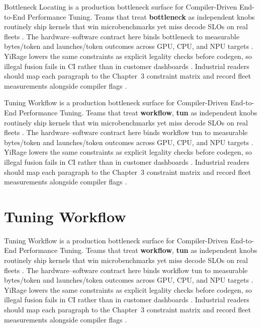 Bottleneck Locating is a production bottleneck surface for Compiler-Driven End-to-End Performance Tuning. Teams that treat \textbf{bottleneck} as independent knobs routinely ship kernels that win microbenchmarks yet miss decode SLOs on real fleets \citep{patel2025llminference,nvidia2022hopper}. The hardware--software contract here binds bottleneck to measurable bytes/token and launches/token outcomes across GPU, CPU, and NPU targets \citep{taxbreak2026,semianalysis2024tma}. YiRage lowers the same constraints as explicit legality checks before codegen, so illegal fusion fails in CI rather than in customer dashboards \citep{memoryfloor2026,amd2024xdna}. Industrial readers should map each paragraph to the Chapter~3 constraint matrix and record fleet measurements alongside compiler flags \citep{nvidia2022hopper,amd2024aie}.

Tuning Workflow is a production bottleneck surface for Compiler-Driven End-to-End Performance Tuning. Teams that treat \textbf{workflow}, \textbf{tun} as independent knobs routinely ship kernels that win microbenchmarks yet miss decode SLOs on real fleets \citep{taxbreak2026,semianalysis2024tma}. The hardware--software contract here binds workflow tun to measurable bytes/token and launches/token outcomes across GPU, CPU, and NPU targets \citep{memoryfloor2026,amd2024xdna}. YiRage lowers the same constraints as explicit legality checks before codegen, so illegal fusion fails in CI rather than in customer dashboards \citep{nvidia2022hopper,amd2024aie}. Industrial readers should map each paragraph to the Chapter~3 constraint matrix and record fleet measurements alongside compiler flags \citep{semianalysis2024tma,dlbook}.

\section{Tuning Workflow}
\label{sec:tuning_workflow}

Tuning Workflow is a production bottleneck surface for Compiler-Driven End-to-End Performance Tuning. Teams that treat \textbf{workflow}, \textbf{tun} as independent knobs routinely ship kernels that win microbenchmarks yet miss decode SLOs on real fleets \citep{memoryfloor2026,amd2024xdna}. The hardware--software contract here binds workflow tun to measurable bytes/token and launches/token outcomes across GPU, CPU, and NPU targets \citep{nvidia2022hopper,amd2024aie}. YiRage lowers the same constraints as explicit legality checks before codegen, so illegal fusion fails in CI rather than in customer dashboards \citep{semianalysis2024tma,dlbook}. Industrial readers should map each paragraph to the Chapter~3 constraint matrix and record fleet measurements alongside compiler flags \citep{amd2024xdna,dao2022flashattention}.

